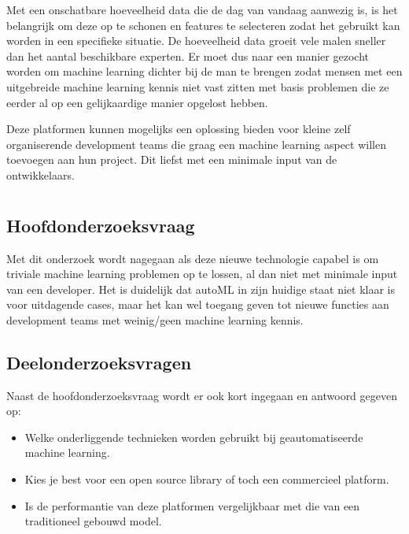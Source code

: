 Met een onschatbare hoeveelheid data die de dag van vandaag aanwezig is, is het belangrijk om deze op te schonen en features te selecteren zodat het gebruikt kan worden in een specifieke situatie. De hoeveelheid data groeit vele malen sneller dan het aantal beschikbare experten. Er moet dus naar een manier gezocht worden om machine learning dichter bij de man te brengen zodat mensen met een uitgebreide machine learning kennis niet vast zitten met basis problemen die ze eerder al op een gelijkaardige manier opgelost hebben.

Deze platformen kunnen mogelijks een oplossing bieden voor kleine zelf organiserende development teams die graag een machine learning aspect willen toevoegen aan hun project. Dit liefst met een minimale input van de ontwikkelaars.

\section{}
\label{sec:onderzoeksvraag}

\subsection{Hoofdonderzoeksvraag}
\label{subsec:hoofdonderzoeksvraag}

Met dit onderzoek wordt nagegaan als deze nieuwe technologie capabel is om triviale machine learning problemen op te lossen, al dan niet met minimale input van een developer. Het is duidelijk dat autoML in zijn huidige staat niet klaar is voor uitdagende cases, maar het kan wel toegang geven tot nieuwe functies aan development teams met weinig/geen machine learning kennis.

\subsection{Deelonderzoeksvragen}
\label{subsec:deelonderzoeksvragen}

Naast de hoofdonderzoeksvraag wordt er ook kort ingegaan en antwoord gegeven op:

\begin{itemize}
    \item Welke onderliggende technieken worden gebruikt bij geautomatiseerde machine learning.
    \item Kies je best voor een open source library of toch een commercieel platform.
    \item Is de performantie van deze platformen vergelijkbaar met die van een traditioneel gebouwd model.
\end{itemize}

